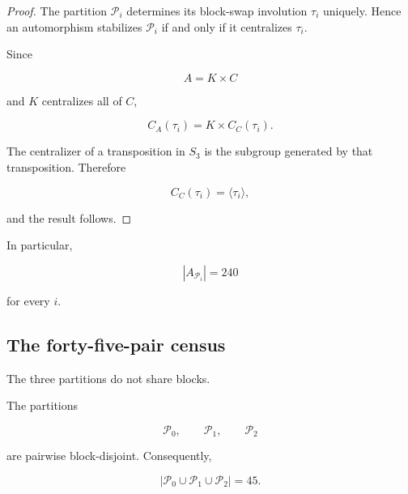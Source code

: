 \begin{proof}

The partition \(\mathcal P_i\) determines its block-swap involution
\(\tau_i\) uniquely. Hence an automorphism stabilizes \(\mathcal P_i\) if
and only if it centralizes \(\tau_i\).

Since

\[
A=K\times C
\]

and \(K\) centralizes all of \(C\),

\[
C_A(\tau_i)
=
K\times C_C(\tau_i).
\]

The centralizer of a transposition in \(S_3\) is the subgroup generated by
that transposition. Therefore

\[
C_C(\tau_i)
=
\langle\tau_i\rangle,
\]

and the result follows.
\end{proof}

In particular,

\[
|A_{\mathcal P_i}|=240
\]

for every \(i\).

\subsection{The forty-five-pair census}


The three partitions do not share blocks.

\begin{proposition}
\label{prop:forty-five-pairs}

The partitions

\[
\mathcal P_0,
\qquad
\mathcal P_1,
\qquad
\mathcal P_2
\]

are pairwise block-disjoint. Consequently,

\[
\left|
\mathcal P_0
\cup
\mathcal P_1
\cup
\mathcal P_2
\right|
=
45.
\]

\end{proposition}

